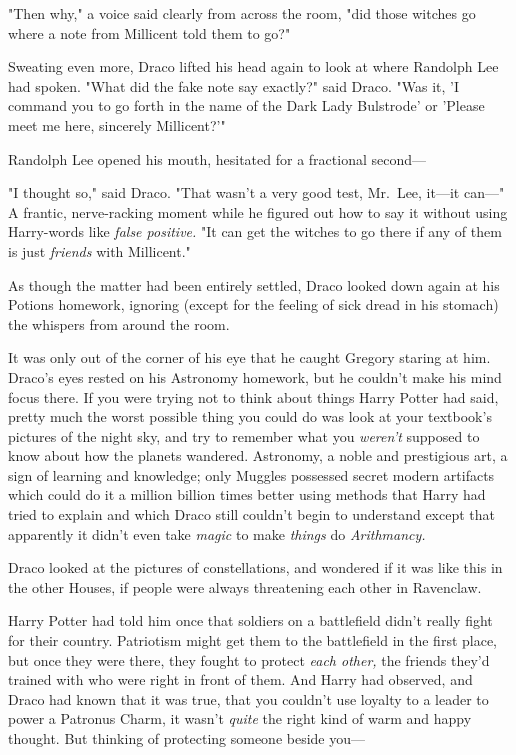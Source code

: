 "Then why," a voice said clearly from across the room, "did those witches go 
where a note from Millicent told them to go?"

Sweating even more, Draco lifted his head again to look at where Randolph Lee 
had spoken. "What did the fake note say exactly?" said Draco. "Was it, 'I 
command you to go forth in the name of the Dark Lady Bulstrode' or 'Please meet 
me here, sincerely Millicent?'"

Randolph Lee opened his mouth, hesitated for a fractional second---

"I thought so," said Draco. "That wasn't a very good test, Mr.~Lee, it---it 
can---" A frantic, nerve-racking moment while he figured out how to say it 
without using Harry-words like \emph{false positive.} "It can get the witches 
to go there if any of them is just \emph{friends} with Millicent."

As though the matter had been entirely settled, Draco looked down again at his 
Potions homework, ignoring (except for the feeling of sick dread in his 
stomach) the whispers from around the room.

It was only out of the corner of his eye that he caught Gregory staring at him.
\sbreak
Draco's eyes rested on his Astronomy homework, but he couldn't make his mind 
focus there. If you were trying not to think about things Harry Potter had 
said, pretty much the worst possible thing you could do was look at your 
textbook's pictures of the night sky, and try to remember what you\emph{ 
weren't} supposed to know about how the planets wandered. Astronomy, a noble 
and prestigious art, a sign of learning and knowledge; only Muggles possessed 
secret modern artifacts which could do it a million billion times better using 
methods that Harry had tried to explain and which Draco still couldn't begin to 
understand except that apparently it didn't even take \emph{magic} to make 
\emph{things} do \emph{Arithmancy.}

Draco looked at the pictures of constellations, and wondered if it was like 
this in the other Houses, if people were always threatening each other in 
Ravenclaw.

Harry Potter had told him once that soldiers on a battlefield didn't really 
fight for their country. Patriotism might get them to the battlefield in the 
first place, but once they were there, they fought to protect \emph{each 
other,} the friends they'd trained with who were right in front of them. And 
Harry had observed, and Draco had known that it was true, that you couldn't use 
loyalty to a leader to power a Patronus Charm, it wasn't \emph{quite} the right 
kind of warm and happy thought. But thinking of protecting someone beside you---

